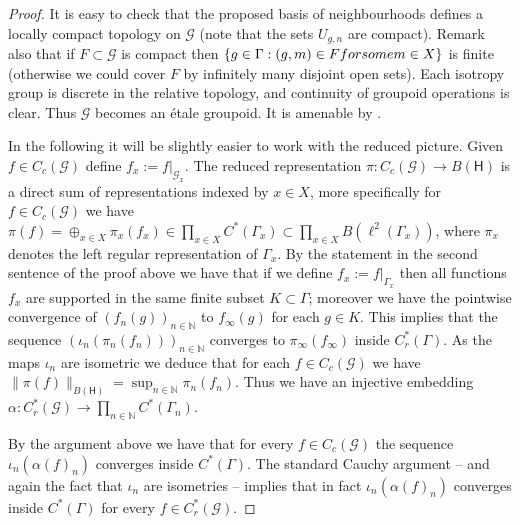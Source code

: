 \documentclass[11 pt, leqno, hidelinks]{amsart}%
\theoremstyle{plain}
\numberwithin{equation}{section}
\newcommand{\G}{\mathcal{G}}
\newcommand{\N}{\mathbb{N}}
\newcommand{\GG}{\mathcal{G}}
\newcommand{\Hil}{\mathsf{H}}
\begin{document}
\begin{proof}
It is easy to check that the proposed basis of neighbourhoods defines a locally compact topology on $\GG$ (note that the sets $U_{g,n}$ are compact). Remark also that if $F\subset \GG$ is compact then $\{g \in \Gamma: (g,m)\in F \textup{ for some }m \in X\}$ is finite (otherwise we could cover $F$ by infinitely many disjoint open sets). Each isotropy group is discrete in the relative topology, and continuity of groupoid operations is clear. Thus $\GG$ becomes an \'etale groupoid. It is amenable by \cite[Theorem 3.5]{Renault}.

In the following it will be slightly easier to work with the reduced picture. Given $f \in C_c(\GG)$ define $f_x:=f|_{\GG_x}$.
The reduced representation $\pi:C_c(\GG)\to B(\Hil)$ is a direct sum of representations indexed by $x \in X$, more specifically for $f \in C_c(\GG)$ we have
$\pi(f) = \oplus_{x \in X} \pi_x (f_x) \in \prod_{x \in X} C^*(\Gamma_x) \subset \prod_{x \in X} B(\ell^2(\Gamma_x))$, where $\pi_x$ denotes the left regular representation of $\Gamma_x$.  By the statement in the second sentence of the proof above we have that if we define $f_x:=f|_{\Gamma_x}$ then all functions $f_x$ are supported in the same finite subset $K\subset \Gamma$; moreover we have the pointwise convergence of $(f_n(g))_{n \in \N}$ to $f_\infty(g)$ for each $g \in K$. This implies that the sequence $(\iota_n(\pi_n(f_n)))_{n \in \N}$ converges  to $\pi_\infty(f_\infty)$ inside $C^*_r(\Gamma)$. As the maps $\iota_n$ are isometric we deduce that for each $f \in C_c(\G)$ we have
$\|\pi(f)\|_{B(\Hil)} = \sup_{n \in \N} \pi_n(f_n)$. Thus we have an injective embedding
$\alpha: C^*_r(\GG) \to \prod_{n\in \N} C^*(\Gamma_n)$.

By the argument above we have that for every $f \in C_c(\GG)$ the sequence $\iota_n(\alpha(f)_n)$ converges inside $C^*(\Gamma)$. The standard Cauchy argument -- and again the fact that $\iota_n$ are isometries -- implies that in fact $\iota_n(\alpha(f)_n)$ converges inside $C^*(\Gamma)$ for every $f \in C^*_r(\GG)$.


\end{proof}
\end{document}
